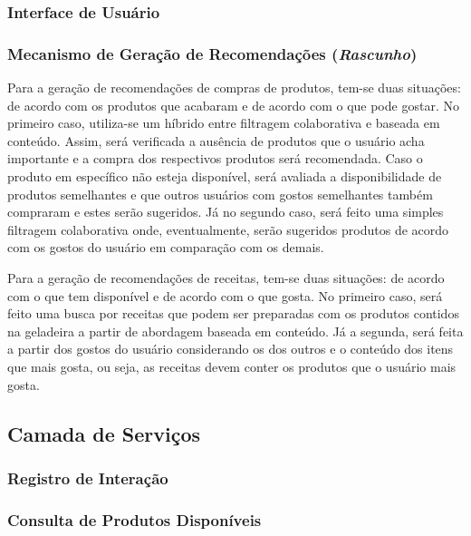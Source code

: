 
\subsubsection{Interface de Usuário}

\subsubsection{Mecanismo de Geração de Recomendações (\textit{Rascunho})}

Para a geração de recomendações de compras de produtos, tem-se duas situações: de acordo com os produtos que acabaram e de acordo com o que pode gostar. No primeiro caso, utiliza-se um híbrido entre filtragem colaborativa e baseada em conteúdo. Assim, será verificada a ausência de produtos que o usuário acha importante e a compra dos respectivos produtos será recomendada. Caso o produto em específico não esteja disponível, será avaliada a disponibilidade de produtos semelhantes e que outros usuários com gostos semelhantes também compraram e estes serão sugeridos. Já no segundo caso, será feito uma simples filtragem colaborativa onde, eventualmente, serão sugeridos produtos de acordo com os gostos do usuário em comparação com os demais.

Para a geração de recomendações de receitas, tem-se duas situações: de acordo com o que tem disponível e de acordo com o que gosta. No primeiro caso, será feito uma busca por receitas que podem ser preparadas com os produtos contidos na geladeira a partir de abordagem baseada em conteúdo. Já a segunda, será feita a partir dos gostos do usuário considerando os dos outros e o conteúdo dos itens que mais gosta, ou seja, as receitas devem conter os produtos que o usuário mais gosta.

\subsection{Camada de Serviços}
\lipsum[1]

\subsubsection{Registro de Interação}


\subsubsection{Consulta de Produtos Disponíveis}

